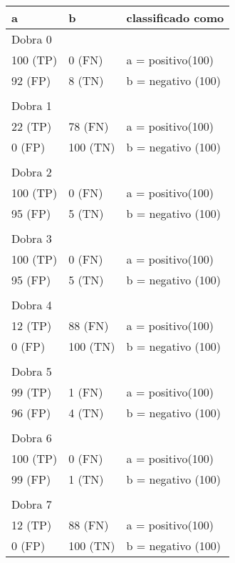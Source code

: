\documentclass[template.tex]{subfiles}
\begin{document}
\begin{table}[!h]
    \begin{tabular}{lll}
    a         					& b                          		& classificado como                                  \\ \hline
	Dobra 0 \\    
    100 (TP)    				&0 (FN)      				& a = positivo(100) \\
    92 (FP)    				&8 (TN)      				& b = negativo (100) \\
	&&\\
	Dobra 1    \\
    22 (TP)    				&78 (FN)      				& a = positivo(100) \\
    0 (FP)    				&100 (TN)      			& b = negativo (100) \\   
	&&\\ 
	Dobra 2    \\
    100 (TP)    				&0 (FN)      				& a = positivo(100) \\
    95 (FP)    				&5 (TN)      				& b = negativo (100) \\   
	&&\\
    Dobra 3    \\
    100 (TP)    				&0 (FN)      				& a = positivo(100) \\
    95 (FP)    				&5 (TN)      				& b = negativo (100) \\   
	&&\\
	Dobra 4    \\
    12 (TP)    				&88 (FN)      				& a = positivo(100) \\ 
    0 (FP)    				&100 (TN)      				& b = negativo (100) \\
	&&\\
	Dobra 5    \\
    99 (TP)    				&1 (FN)      				& a = positivo(100) \\ 
    96 (FP)    				&4 (TN)      				& b = negativo (100) \\
	&&\\
	Dobra 6    \\
    100 (TP)    				&0 (FN)      				& a = positivo(100) \\ 
    99 (FP)    				&1 (TN)      			& b = negativo (100) \\
	&&\\
	Dobra 7    \\
    12 (TP)    				&88 (FN)      				& a = positivo(100) \\ 
    0 (FP)    				&100 (TN)      				& b = negativo (100) \\

\end{tabular}
\end{table}
\end{document}
